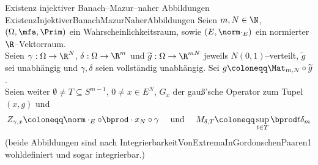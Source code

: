\begin{korollar}{Existenz injektiver Banach--Mazur--naher Abbildungen}
                {ExistenzInjektiverBanachMazurNaherAbbildungen}
Seien $m, N \in \N$,  $(\Omega, \mfa, \Prim)$ ein Wahrscheinlichkeitsraum,
sowie $(E, \norm\cdot_E)$ ein normierter $\R$--Vektorraum.\\
Seien $\gamma: \Omega \rightarrow \R^N$, $\delta: \Omega \rightarrow \R^m$
und $\widetilde g: \Omega \rightarrow \R^{mN}$ jeweils $N(0,1)$--verteilt, 
$\widetilde g$ sei unabhängig und $\gamma, \delta$ seien vollständig
unabhängig. Sei $g\coloneqq  \Mat_{m,N} \circ \widetilde g$.\\
Seien weiter $\emptyset \neq T \subseteq S^{m-1}$, $0 \neq x \in E^N$,
$G_x$ der gauß'sche Operator zum Tupel $(x, g)$ und
\[Z_{\gamma, x}\coloneqq  \norm\cdot_E \circ \bprod \cdot x_N \circ \gamma
\quad \text{ und }\quad M_{\delta, T}\coloneqq  \sup_{t \in T}\bprod t \delta_m\]
(beide Abbildungen sind nach
{IntegrierbarkeitVonExtremaInGordonschenPaaren1} wohldefiniert und sogar
integrierbar.)
   
\end{korollar}